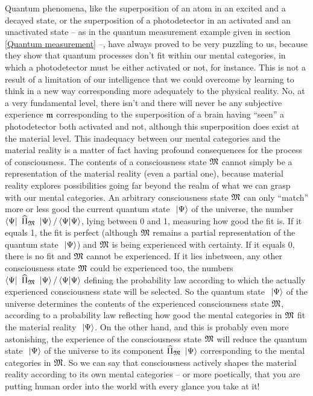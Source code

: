 Quantum phenomena, like the superposition of an atom in an excited and a decayed state, or the superposition of a photodetector in an activated and an unactivated state -- as in the quantum measurement example given in section \ref{Quantum measurement} --, have always proved to be very puzzling to us, because they show that quantum processes don't fit within our mental categories, in which a photodetector must be either activated or not, for instance.
This is not a result of a limitation of our intelligence that we could overcome by learning to think in a new way corresponding more adequately to the physical reality.
No, at a very fundamental level, there isn't and there will never be any subjective experience $\mathfrak{m}$ corresponding to the superposition of a brain having ``seen'' a photodetector both activated and not, although this superposition does exist at the material level.
This inadequacy between our mental categories and the material reality is a matter of fact having profound consequences for the process of consciousness.
The contents of a consciousness state $\mathfrak{M}$ cannot simply be a representation of the material reality (even a partial one), because material reality explores possibilities going far beyond the realm of what we can grasp with our mental categories.
An arbitrary consciousness state $\mathfrak{M}$ can only ``match'' more or less good the current quantum state $\ \left|{\Psi}\right\rangle$ of the universe, the number $\left\langle{\Psi}\right|\  \widehat{\Pi}_{\mathfrak{M}} \ \left|{\Psi}\right\rangle / \left\langle{\Psi}|{\Psi}\right\rangle$, lying between 0 and 1, measuring how good the fit is.
If it equals 1, the fit is perfect (although $\mathfrak{M}$ remains a partial representation of the quantum state $\ \left|{\Psi}\right\rangle$) and $\mathfrak{M}$ is being experienced with certainty.
If it equals 0, there is no fit and $\mathfrak{M}$ cannot be experienced.
If it lies inbetween, any other consciousness state $\mathfrak{M}$ could be experienced too, the numbers $\left\langle{\Psi}\right|\  \widehat{\Pi}_{\mathfrak{M}} \ \left|{\Psi}\right\rangle / \left\langle{\Psi}|{\Psi}\right\rangle$ defining the probability law according to which the actually experienced consciousness state will be selected.
So the quantum state $\ \left|{\Psi}\right\rangle$ of the universe determines the contents of the experienced consciousness state $\mathfrak{M}$, according to a probability law reflecting how good the mental categories in $\mathfrak{M}$ fit the material reality $\ \left|{\Psi}\right\rangle$.
On the other hand, and this is probably even more astonishing, the experience of the consciousness state $\mathfrak{M}$ will reduce the quantum state $\ \left|{\Psi}\right\rangle$ of the universe to its component $\widehat{\Pi}_{\mathfrak{M}} \ \left|{\Psi}\right\rangle$ corresponding to the mental categories in $\mathfrak{M}$.
So we can say that consciousness actively shapes the material reality according to its own mental categories -- or more poetically, that you are putting human order into the world with every glance you take at it!

